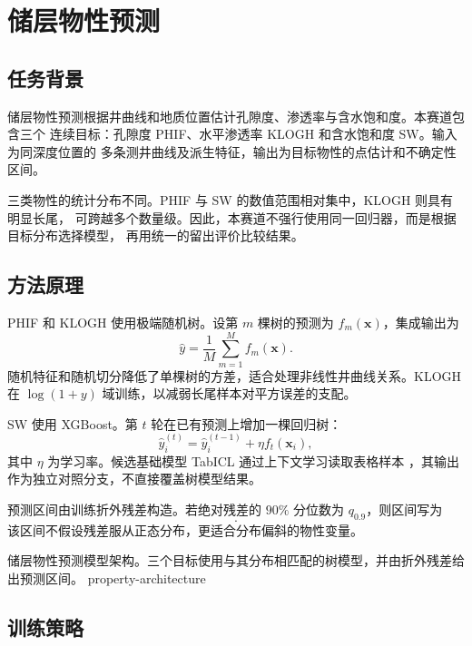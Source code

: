 \chapter{储层物性预测}

\section{任务背景}

储层物性预测根据井曲线和地质位置估计孔隙度、渗透率与含水饱和度。本赛道包含三个
连续目标：孔隙度 PHIF、水平渗透率 KLOGH 和含水饱和度 SW。输入为同深度位置的
多条测井曲线及派生特征，输出为目标物性的点估计和不确定性区间。

三类物性的统计分布不同。PHIF 与 SW 的数值范围相对集中，KLOGH 则具有明显长尾，
可跨越多个数量级。因此，本赛道不强行使用同一回归器，而是根据目标分布选择模型，
再用统一的留出评价比较结果。

\section{方法原理}

PHIF 和 KLOGH 使用极端随机树。设第 $m$ 棵树的预测为 $f_m(\bm{x})$，集成输出为
\begin{equation}
  \hat{y}=\frac{1}{M}\sum_{m=1}^{M}f_m(\bm{x}).
\end{equation}
随机特征和随机切分降低了单棵树的方差，适合处理非线性井曲线关系。KLOGH 在
$\log(1+y)$ 域训练，以减弱长尾样本对平方误差的支配。

SW 使用 XGBoost。第 $t$ 轮在已有预测上增加一棵回归树：
\begin{equation}
  \hat{y}^{(t)}_i=\hat{y}^{(t-1)}_i+\eta f_t(\bm{x}_i),
\end{equation}
其中 $\eta$ 为学习率。候选基础模型 TabICL 通过上下文学习读取表格样本
\cite{qu2025tabicl}，其输出作为独立对照分支，不直接覆盖树模型结果。

预测区间由训练折外残差构造。若绝对残差的 $90\%$ 分位数为 $q_{0.9}$，则区间写为
\begin{equation}
  [\hat{y}-q_{0.9},\ \hat{y}+q_{0.9}] .
\end{equation}
该区间不假设残差服从正态分布，更适合分布偏斜的物性变量。

  {储层物性预测模型架构。三个目标使用与其分布相匹配的树模型，并由折外残差给出预测区间。}
  {property-architecture}

\section{训练策略}

